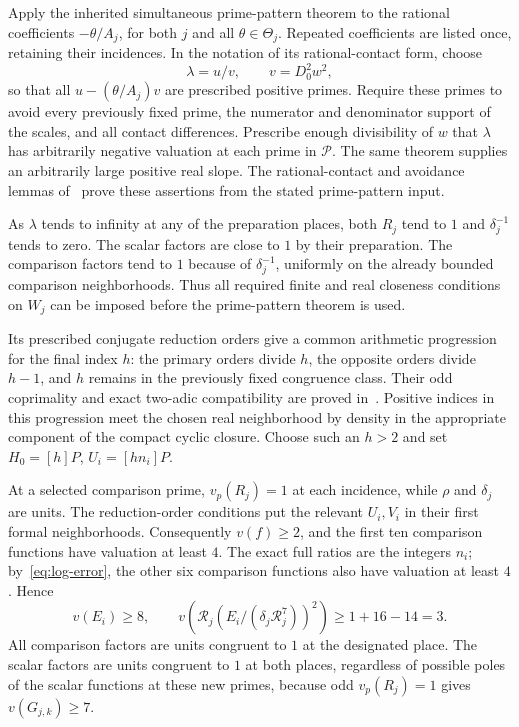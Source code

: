 \documentclass[11pt,a4paper]{article}
\begin{document}
Apply the inherited simultaneous prime-pattern theorem to the rational
coefficients $-\theta/A_j$, for both $j$ and all
$\theta\in\Theta_j$. Repeated coefficients are listed once,
retaining their incidences. In the notation of its rational-contact
form, choose
\[
                    \lambda=u/v,\qquad v=D_0^2w^2,
\]
so that all $u-(\theta/A_j)v$ are prescribed positive primes.
Require these primes to avoid every previously fixed prime, the
numerator and denominator support of the scales, and all contact
differences. Prescribe enough divisibility of $w$ that $\lambda$
has arbitrarily negative valuation at each prime in $\mathcal P$.
The same theorem supplies an arbitrarily large positive real slope.
The rational-contact and avoidance lemmas of~\cite{Dependencies}
prove these assertions from the stated prime-pattern input.

As $\lambda$ tends to infinity at any of the preparation places, both
$R_j$ tend to $1$ and $\delta_j^{-1}$ tends to zero. The scalar
factors are close to $1$ by their preparation. The comparison
factors tend to $1$ because of $\delta_j^{-1}$, uniformly on
the already bounded comparison neighborhoods. Thus all required
finite and real closeness conditions on $W_j$ can be imposed
before the prime-pattern theorem is used.

Its prescribed conjugate reduction orders give a common arithmetic
progression for the final index $h$: the primary orders divide $h$,
the opposite orders divide $h-1$, and $h$ remains in the previously
fixed congruence class. Their odd coprimality and exact two-adic
compatibility are proved in~\cite{Dependencies}. Positive indices
in this progression meet the chosen real neighborhood by density
in the appropriate component of the compact cyclic closure. Choose
such an $h>2$ and set $H_0=[h]P$, $U_i=[hn_i]P$.

At a selected comparison prime, $v_p(R_j)=1$ at each incidence,
while $\rho$ and $\delta_j$ are units. The reduction-order
conditions put the relevant $U_i,V_i$ in their first formal
neighborhoods. Consequently $v(f)\ge2$, and the first ten
comparison functions have valuation at least $4$. The exact
full ratios are the integers $n_i$; by~\eqref{eq:log-error},
the other six comparison functions also have valuation at least
$4$. Hence
\[
 v(E_i)\ge8,\qquad
 v\left(\mathcal R_j
       (E_i/(\delta_j\mathcal R_j^7))^2\right)
                       \ge1+16-14=3.
\]
All comparison factors are units congruent to $1$ at the designated
place. The scalar factors are units congruent to $1$ at both places,
regardless
of possible poles of the scalar functions at these new primes,
because odd $v_p(R_j)=1$ gives $v(G_{j,k})\ge7$.
\end{document}
